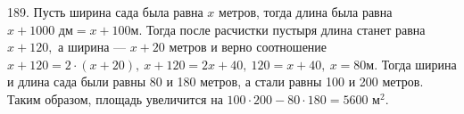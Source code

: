 189. Пусть ширина сада была равна $x$ метров, тогда длина была равна $x+1000\text{ дм}=x+100$м. Тогда после расчистки пустыря длина станет равна $x+120,$ а ширина --- $x+20$ метров и верно соотношение $x+120=2\cdot(x+20),\ x+120=2x+40,\ 120=x+40,\ x=80$м. Тогда ширина и длина сада были равны 80 и 180 метров, а стали равны 100 и 200 метров. Таким образом, площадь увеличится на $100\cdot200-80\cdot180=5600\text{ м}^2.$\\
